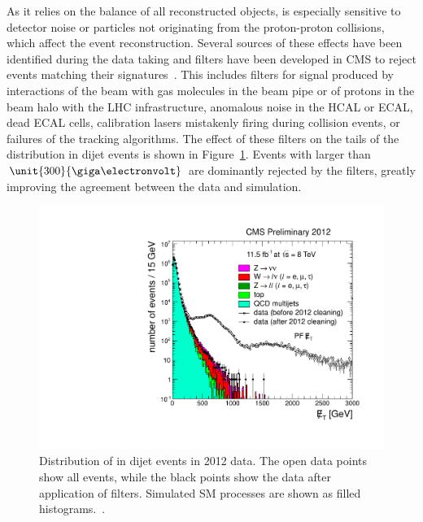 As it relies on the balance of all reconstructed objects, \MET is especially sensitive to detector noise or particles not originating from the proton-proton collisions, which affect the event reconstruction. Several sources of these effects have been identified during the data taking and filters have been developed in CMS to reject events matching their signatures~\cite{CMS-PAS-JME-12-002}. This includes filters for signal produced by interactions of the beam with gas molecules in the beam pipe or of protons in the beam halo with the LHC infrastructure, anomalous noise in the HCAL or ECAL, dead ECAL cells, calibration lasers mistakenly firing during collision events, or failures of the tracking algorithms. The effect of these filters on the tails of the \MET distribution in dijet events is shown in Figure~\ref{fig:METFilters}. Events with \MET larger than $\unit{300}{\giga\electronvolt}$ are dominantly rejected by the filters, greatly improving the agreement between the data and simulation.
\begin{figure}
\begin{center}
\includegraphics[scale=0.4]{plots/SELECTION/metFilter.pdf}
\caption{Distribution of \MET in dijet events in 2012 data. The open data points show all events, while the black points show the data after application of \MET filters. Simulated SM processes are shown as filled histograms.~\cite{CMS-PAS-JME-12-002}.}
\label{fig:METFilters}
\end{center}
\end{figure}


